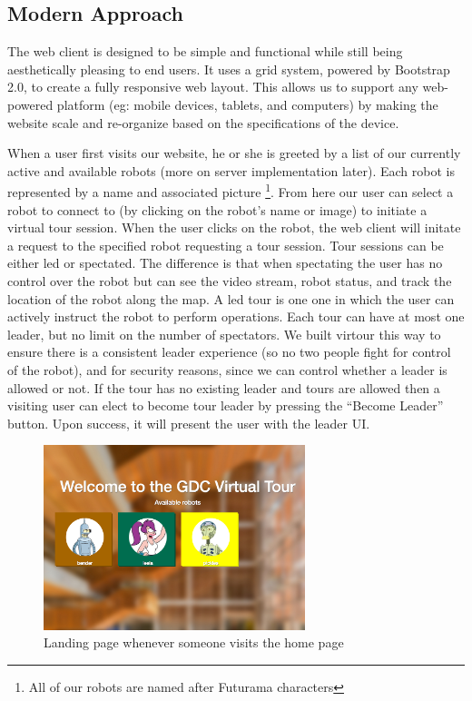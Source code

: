 \documentclass[
  oneside,
  11pt, a4paper,
  footinclude=true,
  headinclude=true,
  cleardoublepage=empty
]{article}
\begin{document}
\subsection{Modern Approach}

The web client is designed to be simple and functional while still being
aesthetically pleasing to end users. It uses a grid system, powered by
Bootstrap 2.0, to create a fully responsive web layout. This allows us to
support any web-powered platform (eg: mobile devices, tablets, and computers)
by making the website scale and re-organize based on the specifications of the
device.

When a user first visits our website, he or she is greeted by a list of our
currently active and available robots (more on server implementation later).
Each robot is represented by a name and associated picture \footnote{All of our
robots are named after Futurama characters}. From here our user can select a
robot to connect to (by clicking on the robot's name or image) to initiate a
virtual tour session. When the user clicks on the robot, the web client will
initate a request to the specified robot requesting a tour session.
Tour sessions can be either led or spectated. The difference is that when
spectating the user has no control over the robot but can see the video stream,
robot status, and track the location of the robot along the map. A led tour is
one one in which the user can actively instruct the robot to perform
operations. Each tour can have at most one leader, but no limit on the number
of spectators. We built virtour this way to ensure there is a consistent leader
experience (so no two people fight for control of the robot), and for security
reasons, since we can control whether a leader is allowed or not. If the tour
has no existing leader and tours are allowed then a visiting user can elect to
become tour leader by pressing the ``Become Leader'' button. Upon success, it
will present the user with the leader UI.

\begin{figure}
\centering
\includegraphics[width=3in]{tour_homepage}
\caption{Landing page whenever someone visits the home page}
\end{figure}
\end{document}
